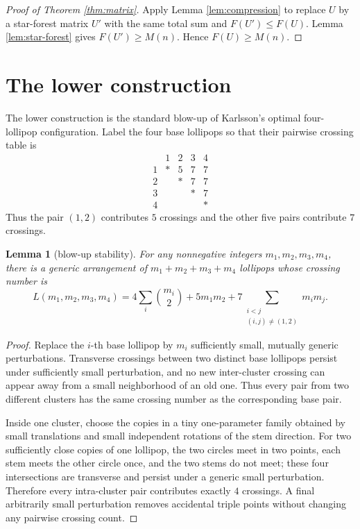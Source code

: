 \documentclass[12pt]{article}
\theoremstyle{plain}
\newtheorem{lemma}[theorem]{Lemma}
\theoremstyle{definition}
\theoremstyle{remark}
\begin{document}
\begin{proof}[Proof of Theorem \ref{thm:matrix}]
Apply Lemma \ref{lem:compression} to replace \(U\) by a star-forest matrix
\(U'\) with the same total sum and \(F(U')\le F(U)\).  Lemma
\ref{lem:star-forest} gives \(F(U')\ge M(n)\).  Hence \(F(U)\ge M(n)\).
\end{proof}

\section{The lower construction}\label{sec:lower}

The lower construction is the standard blow-up of Karlsson's optimal
four-lollipop configuration.  Label the four base lollipops so that their
pairwise crossing table is
\[
\begin{array}{c|cccc}
 &1&2&3&4\\
\hline
1&*&5&7&7\\
2&&*&7&7\\
3&&&*&7\\
4&&&&*
\end{array}
\]
Thus the pair \((1,2)\) contributes \(5\) crossings and the other five pairs
contribute \(7\) crossings.

\begin{lemma}[blow-up stability]\label{lem:blowup}
For any nonnegative integers \(m_1,m_2,m_3,m_4\), there is a generic
arrangement of \(m_1+m_2+m_3+m_4\) lollipops whose crossing number is
\begin{equation}\label{eq:lower-L}
  L(m_1,m_2,m_3,m_4)
  =4\sum_i\binom{m_i}{2}
   +5m_1m_2
   +7\sum_{\substack{i<j\\(i,j)\ne(1,2)}}m_i m_j.
\end{equation}
\end{lemma}

\begin{proof}
Replace the \(i\)-th base lollipop by \(m_i\) sufficiently small, mutually
generic perturbations.  Transverse crossings between two distinct base
lollipops persist under sufficiently small perturbation, and no new
inter-cluster crossing can appear away from a small neighborhood of an old one.
Thus every pair from two different clusters has the same crossing number as
the corresponding base pair.

Inside one cluster, choose the copies in a tiny one-parameter family obtained
by small translations and small independent rotations of the stem direction.
For two sufficiently close copies of one lollipop, the two circles meet in two
points, each stem meets the other circle once, and the two stems do not meet;
these four intersections are transverse and persist under a generic small
perturbation.  Therefore every intra-cluster pair contributes exactly \(4\)
crossings.  A final arbitrarily small perturbation removes accidental triple
points without changing any pairwise crossing count.
\end{proof}
\end{document}
